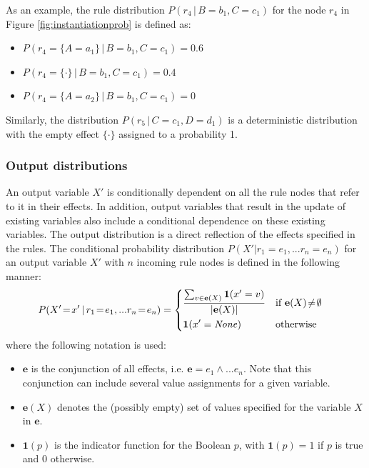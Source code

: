 As an example, the rule distribution $P(r_4 \, | \, B\!=\!b_1, C\!=\!c_1)$ for the node $r_4$ in Figure \ref{fig:instantiationprob} is defined as:
\begin{itemize}
\item $P(r_4 = \{A\!=\!a_1\} \, | \, B\!=\!b_1, C\!=\!c_1) = 0.6$
\item  $P(r_4 = \{\cdot\} \, | \, B\!=\!b_1, C\!=\!c_1) = 0.4$
\item $P(r_4 = \{A\!=\!a_2\} \, | \, B\!=\!b_1, C\!=\!c_1) = 0$
\end{itemize}
Similarly, the distribution $P(r_5 \, | \, C\!=\!c_1, D\!=\!d_1)$ is a deterministic distribution with the empty effect $\{\cdot\}$ assigned to a probability 1. 

\subsubsection*{Output distributions} 

An output variable $X'$ is conditionally dependent on all the rule nodes that refer to it in their effects.  In addition, output variables that result in the update of existing variables also include a conditional dependence on these existing variables. The output distribution is a direct reflection of the effects specified in the rules. The conditional probability distribution $P(X'|r_1\!=\!e_1,...r_n\!=\!e_n)$ for an output variable $X'$ with $n$ incoming rule nodes is defined in the following manner:
\begin{align}
&P(X'\!=\!x' \, | \, r_1\!=\!e_1,... r_n\!=\!e_n) = \begin{dcases}
\frac{\sum_{v \in {\mathbf{e}(X)}} \mathbf{1}(x' = v)} { |\mathbf{e}(X)| } & \text{if } \mathbf{e}(X)\!\neq\!\emptyset \\
\mathbf{1}(x' = \mathit{None}) & \text{otherwise}
\end{dcases}
\label{eq:outputdist1}
\end{align}
where the following notation is used: \begin{itemize}
\item $\mathbf{e}$ is the conjunction of all effects, i.e. $\mathbf{e} = e_1 \land ... e_n$.  Note that this conjunction can include several value assignments for a given variable.
\item $\mathbf{e}(X)$ denotes the (possibly empty) set of values specified for the variable $X$ in $\mathbf{e}$. 
\item $\mathbf{1}(p)$ is the indicator function for the Boolean $p$, with $\mathbf{1}(p)=1$ if $p$ is true and $0$ otherwise.
\end{itemize}

